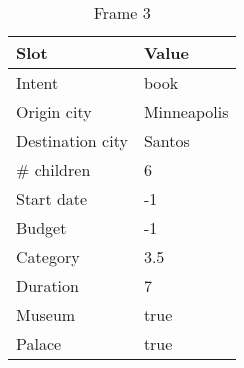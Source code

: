 \begin{table}
    \vspace{\baselineskip}
    \begin{subtable}[t]{\textwidth}
        \centering
        \caption{Frame 3}
        \begin{tabular}[t]{ll}
            \toprule
            Slot & Value \\
            \midrule
            Intent & book \\
            Origin city & Minneapolis \\
            Destination city & Santos \\
            \# children & 6 \\
            Start date & -1 \\
            Budget & -1 \\
            Category & 3.5 \\
            Duration & 7 \\
            Museum & true \\
            Palace & true \\
            \bottomrule
        \end{tabular}
    \end{subtable}
\end{table}
